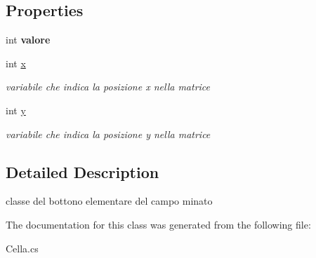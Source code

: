 \subsection*{Properties}
\begin{DoxyCompactItemize}
\item 
\mbox{\label{class_wpf_application10_1_1_cella_a2e829f534fc0c3bbcdcba638db628940}} 
int {\bfseries valore}
\item 
\mbox{\label{class_wpf_application10_1_1_cella_a6f0eb1102ff02ab27e3767c5c5852598}} 
int \hyperlink{class_wpf_application10_1_1_cella_a6f0eb1102ff02ab27e3767c5c5852598}{x}
\begin{DoxyCompactList}\small\item\em variabile che indica la posizione x nella matrice \end{DoxyCompactList}\item 
\mbox{\label{class_wpf_application10_1_1_cella_a2b648fcacbaf4ec37274633409f00e5e}} 
int \hyperlink{class_wpf_application10_1_1_cella_a2b648fcacbaf4ec37274633409f00e5e}{y}
\begin{DoxyCompactList}\small\item\em variabile che indica la posizione y nella matrice \end{DoxyCompactList}\end{DoxyCompactItemize}


\subsection{Detailed Description}
classe del bottono elementare del campo minato 

The documentation for this class was generated from the following file\+:\begin{DoxyCompactItemize}
\item 
Cella.\+cs\end{DoxyCompactItemize}
